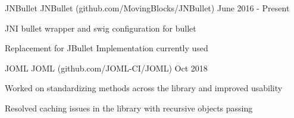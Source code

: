 

\begin{cventries}

    \cventry
    {JNBullet} %
    {JNBullet ({\tiny github.com/MovingBlocks/JNBullet})} %
    {} %
    { June 2016 - Present} %
    {
      \begin{cvitems} %
        \item{JNI bullet wrapper and swig configuration for bullet}
        \item{Replacement for JBullet Implementation currently used }
      \end{cvitems}
    }
    

        \cventry
    {JOML} %
    {JOML ({\tiny github.com/JOML-CI/JOML})} %
    {} %
    {Oct 2018} %
    {
      \begin{cvitems} %
        \item{Worked on standardizing methods across the library and improved usability}
        \item{Resolved caching issues in the library with recursive objects passing}
      \end{cvitems}
    }
    
   

\end{cventries}
